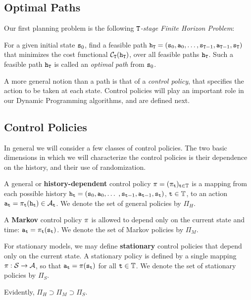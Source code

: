 \subsection{Optimal Paths}

Our first planning problem is the following \emph{${\tt T}$-stage
Finite Horizon Problem}:

\begin{definition}
    For a given initial state ${{\tt s}_0}$, find a feasible path
  ${{\tt h}_{\tt T}} = ({{\tt s}_0},{{\tt a}_0}, \ldots ,{{\tt s}_{{\tt T} - 1}},{{\tt a}_{{\tt T} - 1}},{{\tt s}_{\tt T}})$
  that minimizes the cost functional ${\mathcal{C}_{\tt T}}({{\tt h}_{\tt T}})$, over all feasible paths ${{\tt h}_{\tt T}}$. Such a feasible path ${{\tt h}_{\tt T}}$ is called an
\emph{optimal path} from ${{\tt s}_0}$.
\end{definition}

A more general notion than a path is that of a \emph{control
policy}, that specifies the action to be taken at each state.
Control policies will play an important role in our Dynamic
Programming algorithms, and are defined next.

\subsection{Control Policies}

In general we will consider a few classes of control policies. The
two basic dimensions in which we will characterize the control
policies is their dependence on the history, and their use of
randomization.


\begin{definition}
A general or \textbf{history-dependent} control policy $\pi  =
{({\pi _{\tt t}})_{{\tt t} \in \mathbb{T}}}$ is a mapping from each
possible history ${{\tt h}_{\tt t}} = ({{\tt s}_0},{{\tt a}_0},
\ldots$ $ ,{{\tt s}_{{\tt t}-1}},{{\tt a}_{{\tt t}-1}},{{\tt s}_{\tt t}})$,
${\tt t} \in \mathbb{T}$, to an action ${{\tt a}_{\tt t}} = {\pi
_{\tt t}}({{\tt h}_{\tt t}}) \in {\mathcal{A}_{\tt t}}$.  We denote the
set of general policies by ${\Pi _H}$.
\end{definition}
\begin{definition}
A \textbf{Markov} control policy $\pi $ is allowed to depend only on
the current state and time: ${{\tt a}_{\tt t}} = {\pi
_{\tt t}}({{\tt s}_{\tt t}})$.   We denote the set of Markov policies
by ${\Pi _M}$.
\end{definition}
\begin{definition}
    For stationary models, we may define \textbf{stationary} control
policies that depend only on the current state. A stationary policy
is defined by a single mapping $\pi :\mathcal{S} \to \mathcal{A}$, so
that ${{\tt a}_{\tt t}} = \pi ({{\tt s}_{\tt t}})$ for all ${\tt t}
\in \mathbb{T}$. We denote the set of stationary policies by ${\Pi _S}$.
\end{definition}
Evidently, ${\Pi _H} \supset {\Pi _M} \supset {\Pi _S}$.


